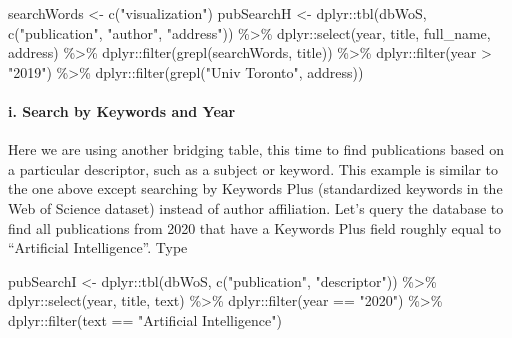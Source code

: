 \documentclass[
]{article}
\newenvironment{Shaded}{\begin{snugshade}}{\end{snugshade}}
\newcommand{\FunctionTok}[1]{\textcolor[rgb]{0.00,0.00,0.00}{#1}}
\newcommand{\NormalTok}[1]{#1}
\newcommand{\OtherTok}[1]{\textcolor[rgb]{0.56,0.35,0.01}{#1}}
\newcommand{\SpecialCharTok}[1]{\textcolor[rgb]{0.00,0.00,0.00}{#1}}
\newcommand{\StringTok}[1]{\textcolor[rgb]{0.31,0.60,0.02}{#1}}
\begin{document}
\begin{Shaded}
\begin{Highlighting}[]
\NormalTok{searchWords }\OtherTok{\textless{}{-}} \FunctionTok{c}\NormalTok{(}\StringTok{"visualization"}\NormalTok{)}
\NormalTok{pubSearchH }\OtherTok{\textless{}{-}}\NormalTok{ dplyr}\SpecialCharTok{::}\FunctionTok{tbl}\NormalTok{(dbWoS, }
  \FunctionTok{c}\NormalTok{(}\StringTok{"publication"}\NormalTok{, }\StringTok{"author"}\NormalTok{, }\StringTok{"address"}\NormalTok{)) }\SpecialCharTok{\%\textgreater{}\%}
\NormalTok{  dplyr}\SpecialCharTok{::}\FunctionTok{select}\NormalTok{(year, title, full\_name, address) }\SpecialCharTok{\%\textgreater{}\%}
\NormalTok{  dplyr}\SpecialCharTok{::}\FunctionTok{filter}\NormalTok{(}\FunctionTok{grepl}\NormalTok{(searchWords, title)) }\SpecialCharTok{\%\textgreater{}\%}
\NormalTok{  dplyr}\SpecialCharTok{::}\FunctionTok{filter}\NormalTok{(year }\SpecialCharTok{\textgreater{}} \StringTok{"2019"}\NormalTok{) }\SpecialCharTok{\%\textgreater{}\%}
\NormalTok{  dplyr}\SpecialCharTok{::}\FunctionTok{filter}\NormalTok{(}\FunctionTok{grepl}\NormalTok{(}\StringTok{"Univ Toronto"}\NormalTok{, address))}
\end{Highlighting}
\end{Shaded}

\hypertarget{i.-search-by-keywords-and-year}{%
\paragraph{i. Search by Keywords and
Year}\label{i.-search-by-keywords-and-year}}

Here we are using another bridging table, this time to find publications
based on a particular descriptor, such as a subject or keyword. This
example is similar to the one above except searching by Keywords Plus
(standardized keywords in the Web of Science dataset) instead of author
affiliation. Let's query the database to find all publications from 2020
that have a Keywords Plus field roughly equal to ``Artificial
Intelligence''. Type

\begin{Shaded}
\begin{Highlighting}[]
\NormalTok{pubSearchI }\OtherTok{\textless{}{-}}\NormalTok{ dplyr}\SpecialCharTok{::}\FunctionTok{tbl}\NormalTok{(dbWoS, }\FunctionTok{c}\NormalTok{(}\StringTok{"publication"}\NormalTok{, }\StringTok{"descriptor"}\NormalTok{)) }\SpecialCharTok{\%\textgreater{}\%}
\NormalTok{  dplyr}\SpecialCharTok{::}\FunctionTok{select}\NormalTok{(year, title, text) }\SpecialCharTok{\%\textgreater{}\%}
\NormalTok{  dplyr}\SpecialCharTok{::}\FunctionTok{filter}\NormalTok{(year }\SpecialCharTok{==} \StringTok{"2020"}\NormalTok{) }\SpecialCharTok{\%\textgreater{}\%}
\NormalTok{  dplyr}\SpecialCharTok{::}\FunctionTok{filter}\NormalTok{(text }\SpecialCharTok{==} \StringTok{"Artificial Intelligence"}\NormalTok{)}
\end{Highlighting}
\end{Shaded}
\end{document}
